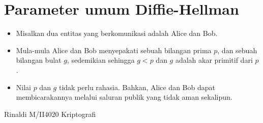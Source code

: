 \documentclass{article}
\begin{document}

\section*{Parameter umum Diffie-Hellman}

\begin{itemize}
    \item Misalkan dua entitas yang berkomunikasi adalah Alice dan Bob.
    \item Mula-mula Alice dan Bob menyepakati sebuah bilangan prima $p$, dan sebuah bilangan bulat $g$, sedemikian sehingga $g < p$ dan $g$ adalah akar primitif dari $p$.
    \item Nilai $p$ dan $g$ tidak perlu rahasia. Bahkan, Alice dan Bob dapat membicarakannya melalui saluran publik yang tidak aman sekalipun.
\end{itemize}

\vspace{10mm}

\begin{center}
Rinaldi M/II4020 Kriptografi
\end{center}
\end{document}
